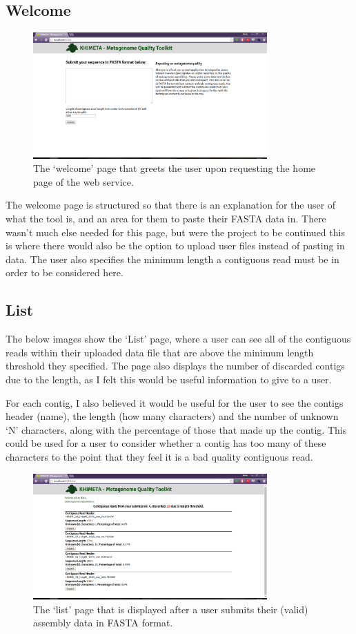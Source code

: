\subsection{Welcome}
\begin{figure}[H]
\centering
\includegraphics[width=0.8\textwidth]{images/ui1}
\caption{The `welcome' page that greets the user upon requesting the home page of the web service.}
\end{figure}

The welcome page is structured so that there is an explanation for the user of what the tool is, and an area for them to paste their FASTA data in. There wasn't much else needed for this page, but were the project to be continued this is where there would also be the option to upload user files instead of pasting in data. The user also specifies the minimum length a contiguous read must be in order to be considered here.

\subsection{List}
The below images show the `List' page, where a user can see all of the contiguous reads within their uploaded data file that are above the minimum length threshold they specified. The page also displays the number of discarded contigs due to the length, as I felt this would be useful information to give to a user.

For each contig, I also believed it would be useful for the user to see the contigs header (name), the length (how many characters) and the number of unknown `N' characters, along with the percentage of those that made up the contig. This could be used for a user to consider whether a contig has too many of these characters to the point that they feel it is a bad quality contiguous read.
\begin{figure}[H]
	\centering
\includegraphics[width=0.8\textwidth]{images/ui2}
\caption{The `list' page that is displayed after a user submits their (valid) assembly data in FASTA format.}
\end{figure}

